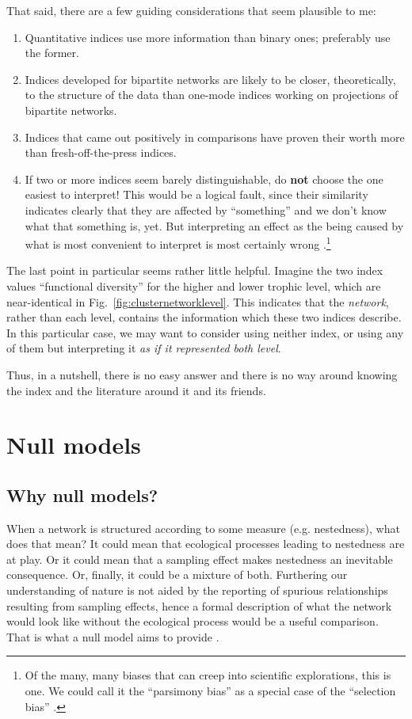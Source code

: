 \documentclass[a4paper, 11pt]{article}
\begin{document}
That said, there are a few guiding considerations that seem plausible to me:
\begin{enumerate}
\item Quantitative indices use more information than binary ones; preferably use the former.
\item Indices developed for bipartite networks are likely to be closer, theoretically, to the structure of the data than one-mode indices working on projections of bipartite networks.
\item Indices that came out positively in comparisons have proven their worth more than fresh-off-the-press indices.
\item If two or more indices seem barely distinguishable, do \textbf{not} choose the one easiest to interpret! This would be a logical fault, since their similarity indicates clearly that they are affected by ``something'' and we don't know what that something is, yet. But interpreting an effect as the being caused by what is most convenient to interpret is most certainly wrong \citep{Shermer2012}.\footnote{Of the many, many biases that can creep into scientific explorations, this is one. We could call it the ``parsimony bias'' as a special case of the ``selection bias'' \citep{Shermer2012}.}
\end{enumerate}
%
The last point in particular seems rather little helpful. Imagine the two index values ``functional diversity'' for the higher and lower trophic level, which are near-identical in Fig.~\ref{fig:clusternetworklevel}. This indicates that the \emph{network}, rather than each level, contains the information which these two indices describe. In this particular case, we may want to consider using neither index, or using any of them but interpreting it \emph{as if it represented \emph{both} level}.

Thus, in a nutshell, there is no easy answer and there is no way around knowing the index and the literature around it and its friends.





\section{Null models} %
  \label{sec:nullmodels}

\subsection{Why null models?}
When a network is structured according to some measure (e.g. nestedness), what does that mean? It could mean that ecological processes leading to nestedness are at play. Or it could mean that a sampling effect makes nestedness an inevitable consequence. Or, finally, it could be a mixture of both. Furthering our understanding of nature is not aided by the reporting of spurious relationships resulting from sampling effects, hence a formal description of what the network would look like without the ecological process would be a useful comparison. That is what a null model aims to provide \citep{Gotelli1996}. 
\end{document}
